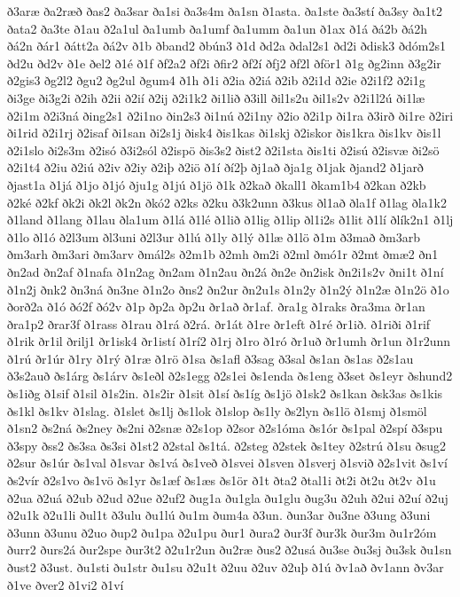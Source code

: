 {ð3aræ
ða2ræð
ðas2
ða3sar
ða1si
ða3s4m
ða1sn
ð1asta.
ða1ste
ða3stí
ða3sy
ða1t2
ðata2
ða3te
ð1au
ð2a1ul
ða1umb
ða1umf
ða1umm
ða1un
ð1ax
ð1á
ðá2b
ðá2h
ðá2n
ðár1
ðátt2a
ðá2v
ð1b
ðband2
ðbún3
ð1d
ðd2a
ðdal2s1
ðd2i
ðdisk3
ðdóm2s1
ðd2u
ðd2v
ð1e
ðel2
ð1é
ð1f
ðf2a2
ðf2i
ðfir2
ðf2í
ðfj2
ðf2l
ðför1
ð1g
ðg2inn
ð3g2ir
ð2gis3
ðg2l2
ðgu2
ðg2ul
ðgum4
ð1h
ð1i
ð2ia
ð2iá
ð2ib
ð2i1d
ð2ie
ð2i1f2
ð2i1g
ði3ge
ði3g2i
ð2ih
ð2ii
ð2ií
ð2ij
ð2i1k2
ði1lið
ð3ill
ðil1s2u
ðil1s2v
ð2i1l2ú
ði1læ
ð2i1m
ð2i3ná
ðing2s1
ð2i1no
ðin2s3
ði1nú
ð2i1ny
ð2io
ð2i1p
ði1ra
ð3irð
ði1re
ð2iri
ði1rid
ð2i1rj
ð2isaf
ði1san
ði2s1j
ðisk4
ðis1kas
ði1skj
ð2iskor
ðis1kra
ðis1kv
ðis1l
ð2i1slo
ði2s3m
ð2isó
ð3i2sól
ð2ispö
ðis3s2
ðist2
ð2i1sta
ðis1ti
ð2isú
ð2isvæ
ði2sö
ð2i1t4
ð2iu
ð2iú
ð2iv
ð2iy
ð2iþ
ð2iö
ð1í
ðí2þ
ðj1að
ðja1g
ð1jak
ðjand2
ð1jarð
ðjast1a
ð1já
ð1jo
ð1jó
ðju1g
ð1jú
ð1jö
ð1k
ð2kað
ðkall1
ðkam1b4
ð2kan
ð2kb
ð2ké
ð2kf
ðk2i
ðk2l
ðk2n
ðkó2
ð2ks
ð2ku
ð3k2unn
ð3kus
ðl1að
ðla1f
ð1lag
ðla1k2
ð1land
ð1lang
ð1lau
ðla1um
ð1lá
ð1lé
ð1lið
ð1lig
ð1lip
ðl1i2s
ð1lit
ð1lí
ðlík2n1
ð1lj
ð1lo
ðl1ó
ð2l3um
ðl3uni
ð2l3ur
ð1lú
ð1ly
ð1lý
ð1læ
ð1lö
ð1m
ð3mað
ðm3arb
ðm3arh
ðm3ari
ðm3arv
ðmál2s
ð2m1b
ð2mh
ðm2i
ð2ml
ðmó1r
ð2mt
ðmæ2
ðn1
ðn2ad
ðn2af
ð1nafa
ð1n2ag
ðn2am
ð1n2au
ðn2á
ðn2e
ðn2isk
ðn2i1s2v
ðni1t
ð1ní
ð1n2j
ðnk2
ðn3ná
ðn3ne
ð1n2o
ðns2
ðn2ur
ðn2u1s
ð1n2y
ð1n2ý
ð1n2æ
ð1n2ö
ð1o
ðorð2a
ð1ó
ðó2f
ðó2v
ð1p
ðp2a
ðp2u
ðr1að
ðr1af.
ðra1g
ð1raks
ðra3ma
ðr1an
ðra1p2
ðrar3f
ð1rass
ð1rau
ð1rá
ð2rá.
ðr1át
ð1re
ðr1eft
ð1ré
ðr1ið.
ð1riði
ð1rif
ð1rik
ðr1il
ðrilj1
ðr1isk4
ðr1istí
ð1rí2
ð1rj
ð1ro
ð1ró
ðr1uð
ðr1umh
ðr1un
ð1r2unn
ð1rú
ðr1úr
ð1ry
ð1rý
ð1ræ
ð1rö
ð1sa
ðs1afl
ð3sag
ð3sal
ðs1an
ðs1as
ð2s1au
ð3s2auð
ðs1árg
ðs1árv
ðs1eðl
ð2s1egg
ð2s1ei
ðs1enda
ðs1eng
ð3set
ðs1eyr
ðshund2
ðs1iðg
ð1sif
ð1sil
ð1s2in.
ð1s2ir
ð1sit
ð1sí
ðs1íg
ðs1jö
ð1sk2
ðs1kan
ðsk3as
ðs1kis
ðs1kl
ðs1kv
ð1slag.
ð1slet
ðs1lj
ðs1lok
ð1slop
ðs1ly
ðs2lyn
ðs1lö
ð1smj
ð1smöl
ð1sn2
ðs2ná
ðs2ney
ðs2ni
ð2snæ
ð2s1op
ð2sor
ð2s1óma
ðs1ór
ðs1pal
ð2spí
ð3spu
ð3spy
ðss2
ðs3sa
ðs3si
ð1st2
ð2stal
ðs1tá.
ð2steg
ð2stek
ðs1tey
ð2strú
ð1su
ðsug2
ð2sur
ðs1úr
ðs1val
ð1svar
ðs1vá
ðs1veð
ð1svei
ð1sven
ð1sverj
ð1svið
ð2s1vit
ðs1ví
ðs2vír
ð2s1vo
ðs1vö
ðs1yr
ðs1æf
ðs1æs
ðs1ör
ð1t
ðta2
ðtal1i
ðt2i
ðt2u
ðt2v
ð1u
ð2ua
ð2uá
ð2ub
ð2ud
ð2ue
ð2uf2
ðug1a
ðu1gla
ðu1glu
ðug3u
ð2uh
ð2ui
ð2uí
ð2uj
ð2u1k
ð2u1li
ðul1t
ð3ulu
ðu1lú
ðu1m
ðum4a
ð3un.
ðun3ar
ðu3ne
ð3ung
ð3uni
ð3unn
ð3unu
ð2uo
ðup2
ðu1pa
ð2u1pu
ður1
ðura2
ður3f
ður3k
ður3m
ðu1r2óm
ðurr2
ðurs2á
ður2spe
ður3t2
ð2u1r2un
ðu2ræ
ðus2
ð2usá
ðu3se
ðu3sj
ðu3sk
ðu1sn
ðust2
ð3ust.
ðu1sti
ðu1str
ðu1su
ð2u1t
ð2uu
ð2uv
ð2uþ
ð1ú
ðv1að
ðv1ann
ðv3ar
ð1ve
ðver2
ð1vi2
ð1ví
}
